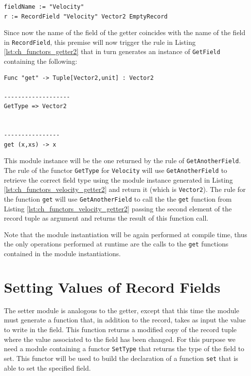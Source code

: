 \begin{lstlisting}
fieldName := "Velocity"
r := RecordField "Velocity" Vector2 EmptyRecord
\end{lstlisting}

Since now the name of the field of the getter coincides with the name of the field in \texttt{RecordField}, this premise will now trigger the rule in Listing \ref{lst:ch_functors_getter2} that in turn generates an instance of \texttt{GetField} containing the following:

\begin{lstlisting}[caption = Getter for Velocity generated by \texttt{GetAnotherField}, label = lst:ch_functors_velocity_getter2]
Func "get" -> Tuple[Vector2,unit] : Vector2

-------------------
GetType => Vector2


----------------
get (x,xs) -> x
\end{lstlisting}

\noindent
This module instance will be the one returned by the rule of \texttt{GetAnotherField}. The rule of the functor \texttt{GetType} for \texttt{Velocity} will use \texttt{GetAnotherField} to retrieve the correct field type using the module instance generated in Listing \ref{lst:ch_functors_velocity_getter2} and return it (which is \texttt{Vector2}). The rule for the function \texttt{get} will use \texttt{GetAnotherField} to call the the \texttt{get} function from Listing \ref{lst:ch_functors_velocity_getter2} passing the second element of the record tuple as argument and returns the result of this function call.

Note that the module instantiation will be again performed at compile time, thus the only operations performed at runtime are the calls to the \texttt{get} functions contained in the module instantiations.

\section{Setting Values of Record Fields}
\label{sec:ch_functors_record_setter}
The setter module is analogous to the getter, except that this time the module must generate a function that, in addition to the record, takes as input the value to write in the field. This function returns a modified copy of the record tuple where the value associated to the field has been changed. For this purpose we need a module containing a functor \texttt{SetType} that returns the type of the field to set. This functor will be used to build the declaration of a function \texttt{set} that is able to set the specified field.

